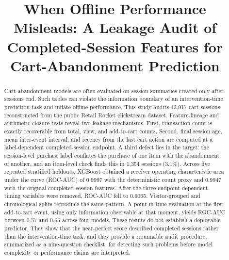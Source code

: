 \documentclass[conference, letterpaper]{IEEEtran}
\begin{document}
\title{When Offline Performance Misleads: A Leakage Audit of Completed-Session Features for Cart-Abandonment Prediction}

\author{
}

\maketitle
\renewcommand{\thefootnote}{\fnsymbol{footnote}}

\begin{abstract}
Cart-abandonment models are often evaluated on session summaries created only after sessions end. Such tables can violate the information boundary of an intervention-time prediction task and inflate offline performance. This study audits 43,917 cart sessions reconstructed from the public Retail Rocket clickstream dataset. Feature-lineage and arithmetic-closure tests reveal two leakage mechanisms. First, transaction count is exactly recoverable from total, view, and add-to-cart counts. Second, final session age, mean inter-event interval, and recency from the last cart action are computed at a label-dependent completed-session endpoint. A third defect lies in the target: the session-level purchase label conflates the purchase of one item with the abandonment of another, and an item-level check finds this in 1,354 sessions (3.1\%). Across five repeated stratified holdouts, XGBoost obtained a receiver operating characteristic area under the curve (ROC-AUC) of 0.9997 with the deterministic count proxy and 0.9947 with the original completed-session features. After the three endpoint-dependent timing variables were removed, ROC-AUC fell to 0.6065. Visitor-grouped and chronological splits reproduce the same pattern. A point-in-time evaluation at the first add-to-cart event, using only information observable at that moment, yields ROC-AUC between 0.57 and 0.65 across four models. These results do not establish a deployable predictor. They show that the near-perfect score described completed sessions rather than the intervention-time task, and they provide a rerunnable audit procedure, summarized as a nine-question checklist, for detecting such problems before model complexity or performance claims are interpreted.
\end{abstract}
\end{document}
